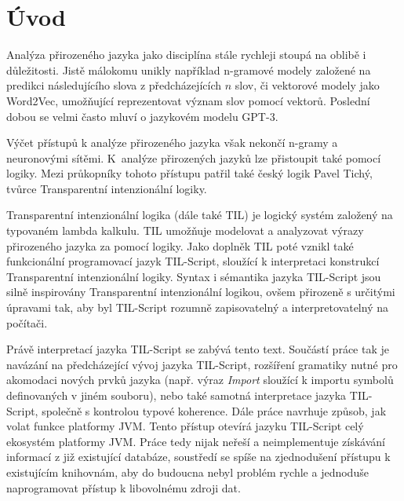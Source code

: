 \chapter{Úvod}
\label{sec:Introduction}

Analýza přirozeného jazyka jako disciplína stále rychleji stoupá na oblibě i důležitosti. Jistě
málokomu unikly například n-gramové modely\cite{ngram-models} založené na predikci následujícího
slova z předcházejících $n$ slov, či vektorové modely jako Word2Vec\cite{word2vec}, umožňující
reprezentovat význam slov pomocí vektorů. Poslední dobou se velmi často mluví o jazykovém modelu
GPT-3\cite{gpt3}.

Výčet přístupů k analýze přirozeného jazyka však nekončí n-gramy a neuronovými sítěmi. K~analýze
přirozených jazyků lze přistoupit také pomocí logiky. Mezi průkopníky tohoto přístupu patřil také
český logik Pavel Tichý, tvůrce Transparentní intenzionální logiky.

Transparentní intenzionální logika (dále také TIL) je logický systém založený na typovaném lambda
kalkulu\cite{til-duzi}. TIL umožňuje modelovat a analyzovat výrazy přirozeného jazyka za pomocí
logiky. Jako doplněk TIL poté vznikl také funkcionální programovací jazyk
TIL-Script\cite{til-script}, sloužící k interpretaci konstrukcí Transparentní intenzionální logiky.
Syntax i sémantika jazyka TIL-Script jsou silně inspirovány Transparentní intenzionální logikou,
ovšem přirozeně s určitými úpravami tak, aby byl TIL-Script rozumně zapisovatelný a
interpretovatelný na počítači.

Právě interpretací jazyka TIL-Script se zabývá tento text. Součástí práce tak je navázání
na předcházející vývoj jazyka TIL-Script, rozšíření gramatiky nutné pro akomodaci nových
prvků jazyka (např. výraz \textit{Import} sloužící k importu symbolů definovaných v jiném
souboru), nebo také samotná interpretace jazyka TIL-Script, společně s kontrolou typové koherence.
Dále práce navrhuje způsob, jak volat funkce platformy JVM. Tento přístup otevírá jazyku TIL-Script
celý ekosystém platformy JVM. Práce tedy nijak neřeší a neimplementuje získávání informací
z již existující databáze, soustředí se spíše na zjednodušení přístupu k existujícím knihovnám, aby
do budoucna nebyl problém rychle a jednoduše naprogramovat přístup k libovolnému zdroji dat.

